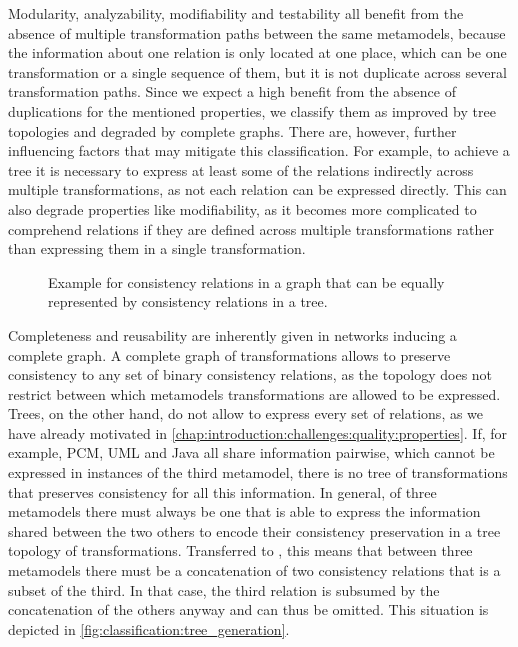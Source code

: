 Modularity, analyzability, modifiability and testability all benefit from the absence of multiple transformation paths between the same metamodels, because the information about one relation is only located at one place, which can be one transformation or a single sequence of them, but it is not duplicate across several transformation paths.
Since we expect a high benefit from the absence of duplications for the mentioned properties, we classify them as improved by tree topologies and degraded by complete graphs.
There are, however, further influencing factors that may mitigate this classification.
For example, to achieve a tree it is necessary to express at least some of the relations indirectly across multiple transformations, as not each relation can be expressed directly.
This can also degrade properties like modifiability, as it becomes more complicated to comprehend relations if they are defined across multiple transformations rather than expressing them in a single transformation.

\begin{figure}
    \centering
    
    \caption[Reducibility of graph to tree]{Example for consistency relations in a graph that can be equally represented by consistency relations in a tree.}
    \label{fig:classification:tree_generation}
\end{figure}

Completeness and reusability are inherently given in networks inducing a complete graph.
A complete graph of transformations allows to preserve consistency to any set of binary consistency relations, as the topology does not restrict between which metamodels transformations are allowed to be expressed.
Trees, on the other hand, do not allow to express every set of relations, as we have already motivated in \autoref{chap:introduction:challenges:quality:properties}.
If, for example, \gls{PCM}, \gls{UML} and Java all share information pairwise, which cannot be expressed in instances of the third metamodel, there is no tree of transformations that preserves consistency for all this information.
In general, of three metamodels there must always be one that is able to express the information shared between the two others to encode their consistency preservation in a tree topology of transformations.
Transferred to \modellevelconsistencyrelations, this means that between three metamodels there must be a concatenation of two consistency relations that is a subset of the third.
In that case, the third relation is subsumed by the concatenation of the others anyway and can thus be omitted.
This situation is depicted in \autoref{fig:classification:tree_generation}.


